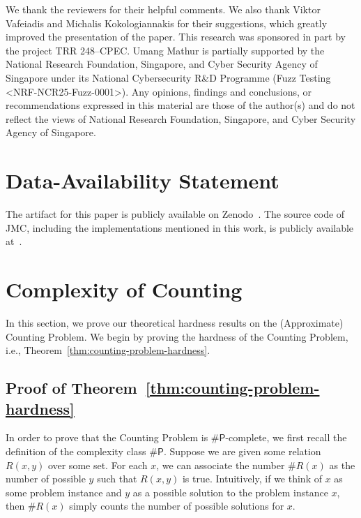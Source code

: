 \documentclass[acmsmall]{acmart}
\newcommand{\jmc}{\textsc{JMC}\xspace}
\newcommand{\sharpP}{\#\mathsf{P}}
\begin{document}
 



\begin{acks}
We thank the reviewers for their helpful comments. We also thank Viktor Vafeiadis and Michalis Kokologiannakis for their suggestions, which greatly improved the presentation of the paper. This research was sponsored in part by the  project \href{https://gepris.dfg.de/gepris/projekt/389792660}{} TRR 248–CPEC. Umang Mathur is partially supported by the National Research Foundation, Singapore, and Cyber Security Agency of Singapore under its National Cybersecurity R\&D Programme (Fuzz Testing <NRF-NCR25-Fuzz-0001>). Any opinions, findings and conclusions, or recommendations expressed in this material are those of the author(s) and do not reflect the views of National Research Foundation, Singapore, and Cyber Security Agency of Singapore.
\end{acks}
\section*{Data-Availability Statement}
The artifact for this paper is publicly available on Zenodo~\cite{zenodo_artifact}. The source code of \jmc, including the implementations mentioned in this work, is publicly available at~\cite{jmc}.




\newpage
\appendix

\section{Complexity of Counting} \label{theory}

In this section, we prove our theoretical hardness results on the (Approximate) Counting Problem. We begin by proving the hardness of the Counting Problem, i.e., Theorem~\ref{thm:counting-problem-hardness}.

\subsection{Proof of Theorem~\ref{thm:counting-problem-hardness}} \label{theory:A}

In order to prove that the Counting Problem is $\sharpP$-complete, we first recall
the definition of the complexity class $\sharpP$. Suppose we are given some relation $R(x,y)$ over some set. For each $x$, we can associate the number $\#R(x)$ as the number
of possible $y$ such that $R(x,y)$ is true. Intuitively, if we think of $x$ as some problem instance and $y$ as a possible solution to the problem instance $x$, then 
$\#R(x)$ simply counts the number of possible solutions for $x$.
\end{document}

